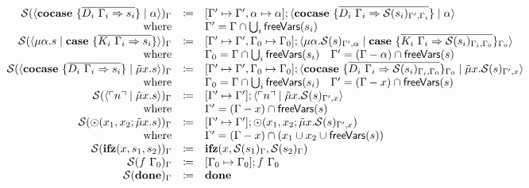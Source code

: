 \[\begin{array}{rcll}
    \substruct{\cut{\cocase{\overline{D_i\ \Gamma_i \Rightarrow s_i}}}{\alpha}}{\Gamma} & \coloneq & \substitute{\Gamma' \mapsto \Gamma', \alpha \mapsto \alpha}{\cut{\cocase{\overline{D_i\ \Gamma_i \Rightarrow \substruct{s_i}{\Gamma', \Gamma_i}}}}{\alpha}} & \\
    \text{where} &  & \Gamma' = \Gamma \cap \bigcup_i \free{s_i} & \\
    \substruct{\cut{\mu\alpha.s}{\case{\overline{K_i\ \Gamma_i \Rightarrow s_i}}}}{\Gamma} & \coloneq & \substitute{\Gamma' \mapsto \Gamma', \Gamma_0 \mapsto \Gamma_0}{\cut{\mu\alpha.\substruct{s}{\Gamma', \alpha}}{\case{\overline{K_i\ \Gamma_i \Rightarrow \substruct{s_i}{\Gamma_i, \Gamma_0}}}_{\Gamma_0}}} & \\
    \text{where} &  & \Gamma_0 = \Gamma \cap \bigcup_i \free{s_i}  \quad  \Gamma' = (\Gamma - \alpha) \cap \free{s} & \\
    \substruct{\cut{\cocase{\overline{D_i\ \Gamma_i \Rightarrow s_i}}}{\tilde{\mu}x.s}}{\Gamma} & \coloneq & \substitute{\Gamma' \mapsto \Gamma', \Gamma_0 \mapsto \Gamma_0}{\cut{\cocase{\overline{D_i\ \Gamma_i \Rightarrow \substruct{s_i}{\Gamma_i, \Gamma_0}}}_{\Gamma_0}}{\tilde{\mu}x.\substruct{s}{\Gamma', x}}} & \\
    \text{where} &  & \Gamma_0 = \Gamma \cap \bigcup_i \free{s_i}  \quad  \Gamma' = (\Gamma - x) \cap \free{s} & \\
    \substruct{\cut{\lit{n}}{\tilde{\mu}x.s}}{\Gamma} & \coloneq & \substitute{\Gamma' \mapsto \Gamma'}{\cut{\lit{n}}{\tilde{\mu}x.\substruct{s}{\Gamma', x}}} & \\
    \text{where} &  & \Gamma' = (\Gamma - x)\cap \free{s} & \\
    \substruct{\odot(x_1, x_2; \tilde{\mu}x.s)}{\Gamma} & \coloneq & \substitute{\Gamma' \mapsto \Gamma'}{\odot(x_1, x_2; \tilde{\mu}x.\substruct{s}{\Gamma', x})} & \\
    \text{where} &  & \Gamma' = (\Gamma - x) \cap (x_1 \cup x_2 \cup \free{s}) & \\
    \substruct{\ifz{x}{s_1}{s_2}}{\Gamma}{} & \coloneq & \ifz{x}{\substruct{s_1}{\Gamma}}{\substruct{s_2}{\Gamma}} & \\
    \substruct{f\ \Gamma_0}{\Gamma} & \coloneq & \substitute{\Gamma_0 \mapsto \Gamma_0}{f\ \Gamma_0} & \\
    \substruct{\done}{\Gamma} & \coloneq & \done & \\
  \end{array}
\]
